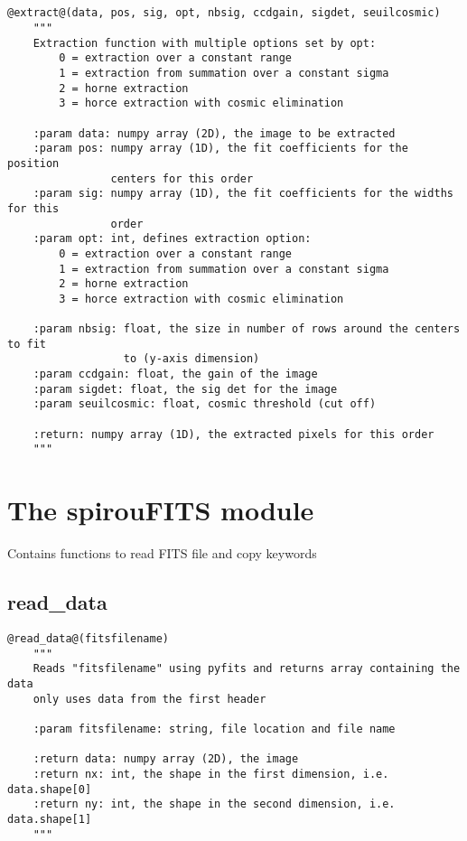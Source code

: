 \subsection{}
\begin{lstlisting}[style=pythonstyle]
@extract@(data, pos, sig, opt, nbsig, ccdgain, sigdet, seuilcosmic)
    """
    Extraction function with multiple options set by opt:
        0 = extraction over a constant range
        1 = extraction from summation over a constant sigma
        2 = horne extraction
        3 = horce extraction with cosmic elimination
    
    :param data: numpy array (2D), the image to be extracted
    :param pos: numpy array (1D), the fit coefficients for the position
                centers for this order
    :param sig: numpy array (1D), the fit coefficients for the widths for this
                order
    :param opt: int, defines extraction option:
        0 = extraction over a constant range
        1 = extraction from summation over a constant sigma
        2 = horne extraction
        3 = horce extraction with cosmic elimination
    
    :param nbsig: float, the size in number of rows around the centers to fit
                  to (y-axis dimension)
    :param ccdgain: float, the gain of the image
    :param sigdet: float, the sig det for the image
    :param seuilcosmic: float, cosmic threshold (cut off)
    
    :return: numpy array (1D), the extracted pixels for this order
    """
\end{lstlisting}

\clearpage
\newpage
\section{The spirouFITS module}

Contains functions to read FITS file and copy keywords

\subsection{read\_data}
\begin{lstlisting}[style=pythonstyle]
@read_data@(fitsfilename)
    """
    Reads "fitsfilename" using pyfits and returns array containing the data
    only uses data from the first header

    :param fitsfilename: string, file location and file name

    :return data: numpy array (2D), the image
    :return nx: int, the shape in the first dimension, i.e. data.shape[0]
    :return ny: int, the shape in the second dimension, i.e. data.shape[1]
    """
\end{lstlisting}

